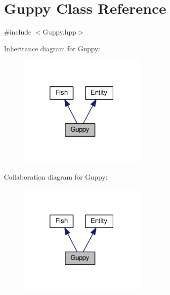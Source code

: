 \hypertarget{classGuppy}{}\section{Guppy Class Reference}
\label{classGuppy}


{\ttfamily \#include $<$Guppy.\+hpp$>$}



Inheritance diagram for Guppy\+:
\nopagebreak
\begin{figure}[H]
\begin{center}
\leavevmode
\includegraphics[width=176pt]{classGuppy__inherit__graph}
\end{center}
\end{figure}


Collaboration diagram for Guppy\+:
\nopagebreak
\begin{figure}[H]
\begin{center}
\leavevmode
\includegraphics[width=176pt]{classGuppy__coll__graph}
\end{center}
\end{figure}

